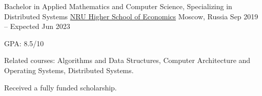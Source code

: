 

\begin{cventries}

  \cventry
  {Bachelor in Applied Mathematics and Computer Science, Specializing in Distributed Systems} %
  {\href{https://www.hse.ru/en/}{NRU Higher School of Economics}} %
  {Moscow, Russia} %
  {Sep 2019 -- Expected Jun 2023} %
  {
    \begin{cvitems} %
      \item GPA: 8.5/10
      \item Related courses:
      Algorithms and Data Structures,
      Computer Architecture and Operating Systems,
      Distributed Systems.
      \item Received a fully funded scholarship.
    \end{cvitems}
  }

\end{cventries}
